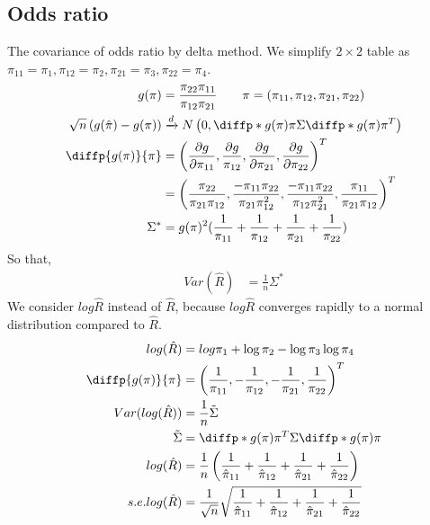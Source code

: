 \subsection{Odds ratio}
	The covariance of odds ratio by delta method. We simplify $2 \times 2$ table as $\pi_{11} = \pi_1, \pi_{12} = \pi_2, \pi_{21} = \pi_3, \pi_{22} = \pi_4$.
	\begin{align*}
		g(\pi) &= \frac{\pi_{22}\pi_{11}}{\pi_{12}\pi_{21}} \qquad \pi=(\pi_{11}, \pi_{12}, \pi_{21}, \pi_{22})\\
		\sqrt{n} \left( g(\hat{\pi}) - g({\pi}) \right) & \xrightarrow[]{d} N \left(0, \diffp*{g(\pi)}{\pi}{} \Sigma \diffp*{g(\pi)}{\pi}{}^T \right)\\
		\diffp{g(\pi)}{\pi}  &= \left( \frac{\partial g}{\partial \pi_{11}}, \frac{\partial g}{\pi_{12}}, \frac{\partial g}{\partial \pi_{21}}, \frac{\partial g}{\partial \pi_{22}} \right)^T\\
		& = \left( \frac{\pi_{22}}{\pi_{21}\pi_{12}}, \frac{-\pi_{11}\pi_{22}}{\pi_{21}\pi_{12}^2}, \frac{-\pi_{11}\pi_{22}}{\pi_{12}\pi_{21}^2}, \frac{\pi_{11}}{\pi_{21}\pi_{12}} \right)^T\\
		\Sigma^{\ast} &= g(\pi)^2(\frac{1}{\pi_{11}} + \frac{1}{\pi_{12}} + \frac{1}{\pi_{21}} + \frac{1}{\pi_{22}})
	\end{align*} 
	So that,
	\begin{align*}
		Var(\hat R) &=  \frac{1}{n} \Sigma^{\ast} 
	\end{align*} 
	We consider $log \hat R$ instead of $\hat R$, because $log \hat R$ converges rapidly to a normal distribution compared to $\hat R$.
	\begin{align*}
		log(\hat{R}) &= log \pi_1 + \log \pi_2 - \log \pi_3  \log \pi_4\\
		\diffp{g(\pi)}{\pi}  &= \left(\frac{1}{\pi_{11}} , -\frac{1}{\pi_{12}}, -\frac{1}{\pi_{21}}, \frac{1}{\pi_{22}} \right)^T\\
		Var(log(\hat{R})) &= \frac{1}{n} \Tilde{\Sigma} \\
		\Tilde{\Sigma} &= \diffp*{g(\pi)}{\pi}{}^T \Sigma \diffp*{g(\pi)}{\pi}{}\\
		log(\hat R) &=  \frac{1}{n}\left( \frac{1}{\hat \pi_{11}} + \frac{1}{\hat \pi_{12}} + \frac{1}{\hat \pi_{21}} + \frac{1}{\hat \pi_{22}} \right)\\
		s.e. log(\hat R) &=  \frac{1}{\sqrt{n}} \sqrt{\frac{1}{\hat \pi_{11}} + \frac{1}{\hat \pi_{12}} + \frac{1}{\hat \pi_{21}} + \frac{1}{\hat \pi_{22}}} 
	\end{align*} 

